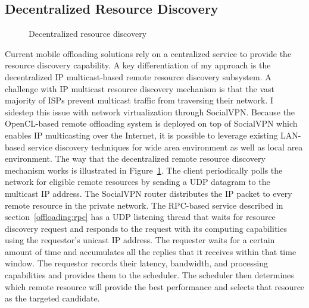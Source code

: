 \subsection{Decentralized Resource Discovery}
\label{offloading:discovery}
%
\begin{figure}
\centering
{}
\caption{Decentralized resource discovery}
\label{fig:discovery}
\end{figure}
%
Current mobile offloading solutions rely on a centralized service to
provide the resource discovery capability.
%
A key differentiation of my approach is the decentralized IP
multicast-based remote resource discovery subsystem.
%
A challenge with IP multicast resource discovery mechanism is that the
vast majority of ISPs prevent multicast traffic from traversing their
network.
%
I sidestep this issue with network virtualization through SocialVPN.
%
Because the OpenCL-based remote offloading system is deployed on top of
SocialVPN which enables IP multicasting over the Internet, it is
possible to leverage existing LAN-based service discovery techniques for
wide area environment as well as local area environment.
%
The way that the decentralized remote resource discovery mechanism works
is illustrated in Figure~\ref{fig:discovery}.
%
The client periodically polls the network for eligible remote resources
by sending a UDP datagram to the multicast IP address.
%
The SocialVPN router distributes the IP packet to every remote resource
in the private network.
%
The RPC-based service described in section~\ref{offloading:rpc} has a
UDP listening thread that waits for resource discovery request and
responds to the request with its computing capabilities using the
requestor's unicast IP address.
%
The requester waits for a certain amount of time and accumulates all the
replies that it receives within that time window.
%
The requestor records their latency, bandwidth, and processing
capabilities and provides them to the scheduler.
%
The scheduler then determines which remote resource will provide the
best performance and selects that resource as the targeted candidate.
%
